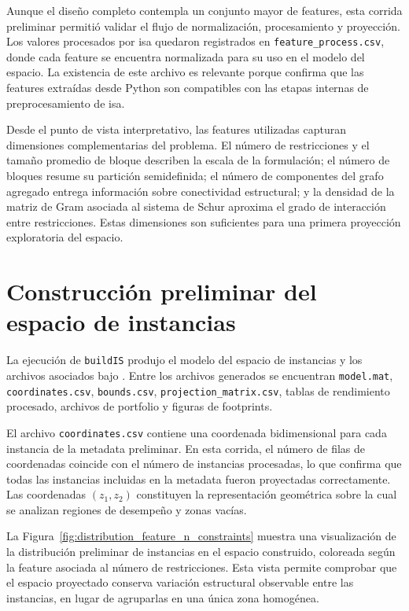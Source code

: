 Aunque el diseño completo contempla un conjunto mayor de features, esta corrida
preliminar permitió validar el flujo de normalización, procesamiento y proyección.
Los valores procesados por \acrshort{isa} quedaron registrados en
\texttt{feature\_process.csv}, donde cada feature se encuentra normalizada para su uso
en el modelo del espacio.
La existencia de este archivo es relevante porque confirma que las features extraídas
desde Python son compatibles con las etapas internas de preprocesamiento de
\acrshort{isa}.

Desde el punto de vista interpretativo, las features utilizadas capturan dimensiones
complementarias del problema.
El número de restricciones y el tamaño promedio de bloque describen la escala de la
formulación; el número de bloques resume su partición semidefinida; el número de
componentes del grafo agregado entrega información sobre conectividad estructural; y
la densidad de la matriz de Gram asociada al sistema de Schur aproxima el grado de interacción entre
restricciones.
Estas dimensiones son suficientes para una primera proyección exploratoria del
espacio.

\section{Construcción preliminar del espacio de instancias}
\label{sec:resultados_build_is}

La ejecución de \texttt{buildIS} produjo el modelo del espacio de instancias y los
archivos asociados bajo .
Entre los archivos generados se encuentran \texttt{model.mat},
\texttt{coordinates.csv}, \texttt{bounds.csv}, \texttt{projection\_matrix.csv},
tablas de rendimiento procesado, archivos de portfolio y figuras de footprints.

El archivo \texttt{coordinates.csv} contiene una coordenada bidimensional para cada
instancia de la metadata preliminar.
En esta corrida, el número de filas de coordenadas coincide con el número de
instancias procesadas, lo que confirma que todas las instancias incluidas en la
metadata fueron proyectadas correctamente.
Las coordenadas $(z_1,z_2)$ constituyen la representación geométrica sobre la cual se
analizan regiones de desempeño y zonas vacías.

La Figura~\ref{fig:distribution_feature_n_constraints} muestra una visualización de
la distribución preliminar de instancias en el espacio construido, coloreada según la
feature asociada al número de restricciones.
Esta vista permite comprobar que el espacio proyectado conserva variación estructural
observable entre las instancias, en lugar de agruparlas en una única zona homogénea.

